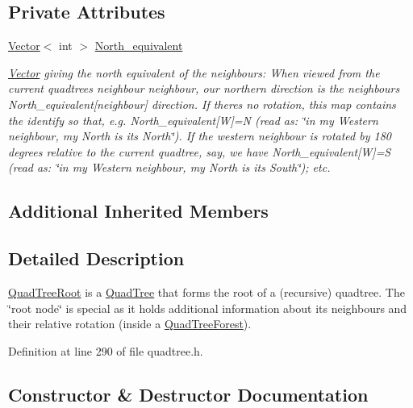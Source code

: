 \subsection*{Private Attributes}
\begin{DoxyCompactItemize}
\item 
\hyperlink{classoomph_1_1Vector}{Vector}$<$ int $>$ \hyperlink{classoomph_1_1QuadTreeRoot_a1fab216e4efa231e156c8406ad2e0da6}{North\+\_\+equivalent}
\begin{DoxyCompactList}\small\item\em \hyperlink{classoomph_1_1Vector}{Vector} giving the north equivalent of the neighbours\+: When viewed from the current quadtree\textquotesingle{}s {\ttfamily neighbour} neighbour, our northern direction is the neighbour\textquotesingle{}s North\+\_\+equivalent\mbox{[}neighbour\mbox{]} direction. If there\textquotesingle{}s no rotation, this map contains the identify so that, e.\+g. {\ttfamily North\+\_\+equivalent}\mbox{[}W\mbox{]}=N (read as\+: \char`\"{}in my Western
neighbour, my North is its North\char`\"{}). If the western neighbour is rotated by 180 degrees relative to the current quadtree, say, we have {\ttfamily North\+\_\+equivalent}\mbox{[}W\mbox{]}=S (read as\+: \char`\"{}in my Western
neighbour, my North is its South\char`\"{}); etc. \end{DoxyCompactList}\end{DoxyCompactItemize}
\subsection*{Additional Inherited Members}


\subsection{Detailed Description}
\hyperlink{classoomph_1_1QuadTreeRoot}{Quad\+Tree\+Root} is a \hyperlink{classoomph_1_1QuadTree}{Quad\+Tree} that forms the root of a (recursive) quadtree. The \char`\"{}root node\char`\"{} is special as it holds additional information about its neighbours and their relative rotation (inside a \hyperlink{classoomph_1_1QuadTreeForest}{Quad\+Tree\+Forest}). 

Definition at line 290 of file quadtree.\+h.



\subsection{Constructor \& Destructor Documentation}
\mbox{\label{classoomph_1_1QuadTreeRoot_a30cf086b11949193946818c43aeec5e5}} 
